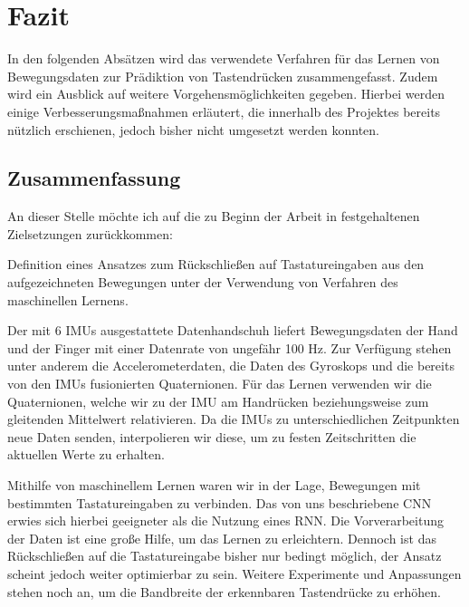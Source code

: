 \chapter{Fazit} 

In den folgenden Absätzen wird das verwendete Verfahren für das Lernen von Bewegungsdaten zur Prädiktion von Tastendrücken zusammengefasst. Zudem wird ein Ausblick auf weitere Vorgehensmöglichkeiten gegeben. Hierbei werden einige Verbesserungsmaßnahmen erläutert, die innerhalb des Projektes bereits nützlich erschienen, jedoch bisher nicht umgesetzt werden konnten.

\section{Zusammenfassung}


An dieser Stelle möchte ich auf die zu Beginn der Arbeit in  festgehaltenen Zielsetzungen zurückkommen:

\begin{displayquote}
    Definition eines Ansatzes zum Rückschließen auf Tastatureingaben aus den aufgezeichneten Bewegungen unter der Verwendung von Verfahren des maschinellen Lernens.
\end{displayquote}

Der mit 6 IMUs ausgestattete Datenhandschuh liefert Bewegungsdaten der Hand und der Finger mit einer Datenrate von ungefähr 100 Hz. Zur Verfügung stehen unter anderem die Accelerometerdaten, die Daten des Gyroskops und die bereits von den IMUs fusionierten Quaternionen. Für das Lernen verwenden wir die Quaternionen, welche wir zu der IMU am Handrücken beziehungsweise zum gleitenden Mittelwert relativieren. Da die IMUs zu unterschiedlichen Zeitpunkten neue Daten senden, interpolieren wir diese, um zu festen Zeitschritten die aktuellen Werte zu erhalten.

Mithilfe von maschinellem Lernen waren wir in der Lage, Bewegungen mit bestimmten Tastatureingaben zu verbinden. Das von uns beschriebene CNN erwies sich hierbei geeigneter als die Nutzung eines RNN. Die Vorverarbeitung der Daten ist eine große Hilfe, um das Lernen zu erleichtern. Dennoch ist das Rückschließen auf die Tastatureingabe bisher nur bedingt möglich, der Ansatz scheint jedoch weiter optimierbar zu sein. Weitere Experimente und Anpassungen stehen noch an, um die Bandbreite der erkennbaren Tastendrücke zu erhöhen.

